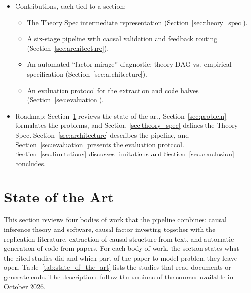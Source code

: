 \begin{itemize}
    \begin{itemize}
    \tightlist
    \item
      \textbf{Empirical papers first.} Equilibrium and theory papers are
      routed to a separate path (Section~\ref{sec:limitations}).
    \item
      \textbf{Cross-sectional anomalies as initial scope.} Small DAGs and
      public ground-truth implementations \cite{chen2022open}.
    \item
      \textbf{Public data only.} The simulator must run without
      proprietary data.
    \item
      \textbf{Firm-level nodes only.} Macroeconomic nodes, time-unrolling,
      and point-in-time macro data are treated in a companion paper
      \cite{adia2026macro}.
    \end{itemize}
  \item
    Contributions, each tied to a section:

    \begin{itemize}
    \tightlist
    \item
      The Theory Spec intermediate representation (Section~\ref{sec:theory_spec}).
    \item
      A six-stage pipeline with causal validation and feedback routing
      (Section~\ref{sec:architecture}).
    \item
      An automated ``factor mirage'' diagnostic: theory DAG vs.~empirical
      specification (Section~\ref{sec:architecture}).
    \item
      An evaluation protocol for the extraction and code halves (Section~\ref{sec:evaluation}).
    \end{itemize}
  \item
    Roadmap: Section~\ref{sec:state_of_the_art} reviews the state of the art,
    Section~\ref{sec:problem} formulates the problems, and
    Section~\ref{sec:theory_spec} defines the Theory Spec.
    Section~\ref{sec:architecture} describes the pipeline, and
    Section~\ref{sec:evaluation} presents the evaluation protocol.
    Section~\ref{sec:limitations} discusses limitations and
    Section~\ref{sec:conclusion} concludes.
  \end{itemize}

  \section{State of the Art}\label{sec:state_of_the_art}

  This section reviews four bodies of work that the pipeline combines:
  causal inference theory and software, causal factor investing together with
  the replication literature, extraction of causal structure from text, and
  automatic generation of code from papers. For each body of work, the
  section states what the cited studies did and which part of the
  paper-to-model problem they leave open.
  Table~\ref{tab:state_of_the_art} lists the studies that read documents or
  generate code. The descriptions follow the versions of the sources
  available in October 2026.

